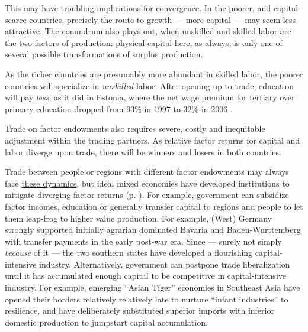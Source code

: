 \documentclass[11pt,a4paper,oneside,openright]{article}
\begin{document}
This may have troubling implications for convergence. 
In the poorer, and capital-scarce countries, precisely the route to growth --- more capital --- may seem less attractive. 
The conundrum also plays out, when unskilled and skilled labor are the two factors of production: 
physical capital here, as always, is only one of several possible transformations of surplus production. 

As the richer countries are presumably more abundant in skilled labor, the poorer countries will specialize in \emph{unskilled} labor. 
After opening up to trade, education will pay \emph{less}, as it did in Estonia, where the net wage premium for tertiary over primary education dropped from 93\% in 1997 to 32\% in 2006 \citep[33]{Piatkowski2008}.


Trade on factor endowments also requires severe, costly and inequitable adjustment within the trading partners. 
As relative factor returns for capital and labor diverge upon trade, there will be winners and losers in both countries. 

Trade between people or regions with different factor endowments may always face \hyperref[sec:space]{these dynamics}, but ideal mixed economies have developed institutions to mitigate diverging factor returns (p. \pageref{sec:space}). 
For example, government can subsidize factor incomes, education or generally transfer capital to regions and people to let them leap-frog to higher value production. 
For example, (West) Germany strongly supported initially agrarian dominated Bavaria and Baden-Wurttemberg with transfer payments in the early post-war era. 
Since --- surely not simply \emph{because} of it --- the two southern states have developed a flourishing capital-intensive industry. 
Alternatively, government can postpone trade liberalization until it has accumulated enough capital to be competitive in capital-intensive industry. 
For example, emerging ``Asian Tiger'' economies in Southeast Asia have opened their borders relatively relatively late to nurture ``infant industries'' to resilience, and have deliberately substituted superior imports with inferior domestic production to jumpstart capital accumulation.
\end{document}

